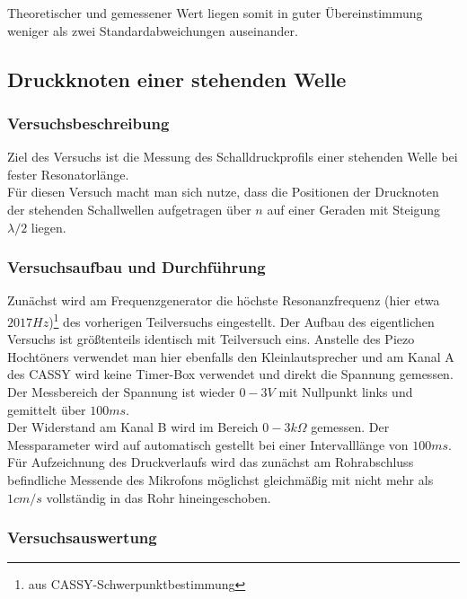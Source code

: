 \documentclass[12pt,a4paper]{article}
\begin{document}
Theoretischer und gemessener Wert liegen somit in guter Übereinstimmung weniger als zwei Standardabweichungen auseinander.




\subsection{Druckknoten einer stehenden Welle}

\subsubsection{Versuchsbeschreibung}
Ziel des Versuchs ist die Messung des Schalldruckprofils einer stehenden Welle bei fester Resonatorlänge.\\
Für diesen Versuch macht man sich nutze, dass die Positionen der Drucknoten der stehenden Schallwellen aufgetragen über $n$ auf einer Geraden mit Steigung  $\lambda/2$ liegen.

\subsubsection{Versuchsaufbau und Durchführung}
Zunächst wird am Frequenzgenerator die höchste Resonanzfrequenz (hier etwa $2017Hz$)\footnote{aus CASSY-Schwerpunktbestimmung} des vorherigen Teilversuchs eingestellt.
Der Aufbau des eigentlichen Versuchs ist größtenteils identisch mit Teilversuch eins. Anstelle des Piezo Hochtöners verwendet man hier ebenfalls den Kleinlautsprecher und am Kanal A des CASSY wird keine Timer-Box verwendet und direkt die Spannung gemessen. Der Messbereich der Spannung ist wieder $0-3V$ mit Nullpunkt links und gemittelt über $100ms$.\\
Der Widerstand am Kanal B wird im Bereich $0-3k \Omega $ gemessen.
Der Messparameter wird auf automatisch gestellt bei einer Intervalllänge von $100ms$.\\
Für Aufzeichnung des Druckverlaufs wird das zunächst am Rohrabschluss  befindliche Messende des Mikrofons möglichst gleichmäßig mit nicht mehr als $1cm/s$ vollständig in das Rohr hineingeschoben.

\subsubsection{Versuchsauswertung}
\end{document}
